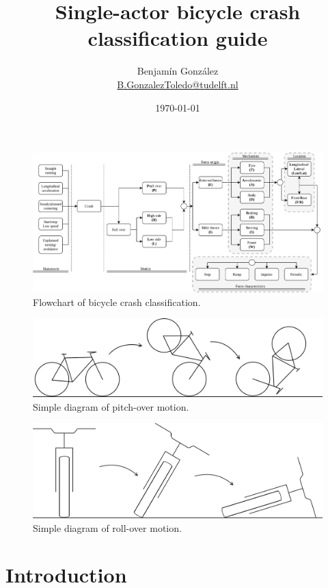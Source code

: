 \documentclass{article}
\title{Single-actor bicycle crash classification guide}
\author{
  Benjam\'in Gonz\'alez\\
  \small{\href{mailto:b.gonzaleztoledo@tudelft.nl}{B.GonzalezToledo@tudelft.nl}}
  }
\date{\today}
\begin{document}
\maketitle

\begin{figure}
    \centering
    \includegraphics[angle=90, height = \textheight]{class-mindmap-v2.png}
    \caption{Flowchart of bicycle crash classification.}
    \label{fig: flowchart}
\end{figure}

\begin{figure}[h]
    \centering
    \includegraphics[width=\linewidth]{pitch-over.png}
    \caption{Simple diagram of pitch-over motion.}
    \label{fig: pitchover}
\end{figure}

\begin{figure}[h]
    \centering
    \includegraphics[width=\linewidth]{roll-over.png}
    \caption{Simple diagram of roll-over motion.}
    \label{fig: rollover}
\end{figure}
\section{Introduction}
\end{document}
